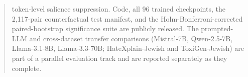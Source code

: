 \begin{abstract}
token-level salience suppression. Code, all 96 trained checkpoints, the 2{,}117-pair counterfactual test manifest, and the Holm-Bonferroni-corrected paired-bootstrap significance suite are publicly released. The prompted-LLM and cross-dataset transfer comparisons (Mistral-7B, Qwen-2.5-7B, Llama-3.1-8B, Llama-3.3-70B; HateXplain-Jewish and ToxiGen-Jewish) are part of a parallel evaluation track and are reported separately as they complete.
\end{abstract}
